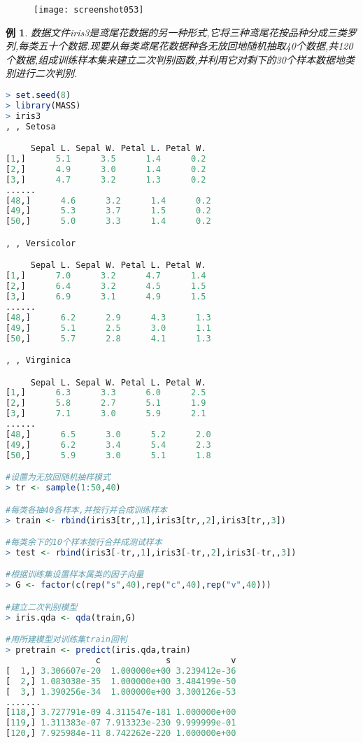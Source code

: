 \documentclass[11pt,a4paper,oneside]{book}
\newtheorem{e}{例}
\begin{document}
\begin{figure}[H]
	\centering
	\texttt{[image: screenshot053]}
\end{figure}
\begin{e}
数据文件iris3是鸢尾花数据的另一种形式,它将三种鸢尾花按品种分成三类罗列,每类五十个数据.现要从每类鸢尾花数据种各无放回地随机抽取40个数据,共120个数据,组成训练样本集来建立二次判别函数,并利用它对剩下的30个样本数据地类别进行二次判别.
\end{e}
\begin{lstlisting}[language=r]
> set.seed(8)
> library(MASS)
> iris3
, , Setosa

     Sepal L. Sepal W. Petal L. Petal W.
[1,]      5.1      3.5      1.4      0.2
[2,]      4.9      3.0      1.4      0.2
[3,]      4.7      3.2      1.3      0.2
......
[48,]      4.6      3.2      1.4      0.2
[49,]      5.3      3.7      1.5      0.2
[50,]      5.0      3.3      1.4      0.2

, , Versicolor

     Sepal L. Sepal W. Petal L. Petal W.
[1,]      7.0      3.2      4.7      1.4
[2,]      6.4      3.2      4.5      1.5
[3,]      6.9      3.1      4.9      1.5
......
[48,]      6.2      2.9      4.3      1.3
[49,]      5.1      2.5      3.0      1.1
[50,]      5.7      2.8      4.1      1.3

, , Virginica

     Sepal L. Sepal W. Petal L. Petal W.
[1,]      6.3      3.3      6.0      2.5
[2,]      5.8      2.7      5.1      1.9
[3,]      7.1      3.0      5.9      2.1
......
[48,]      6.5      3.0      5.2      2.0
[49,]      6.2      3.4      5.4      2.3
[50,]      5.9      3.0      5.1      1.8

#设置为无放回随机抽样模式
> tr <- sample(1:50,40)

#每类各抽40各样本,并按行并合成训练样本
> train <- rbind(iris3[tr,,1],iris3[tr,,2],iris3[tr,,3])

#每类余下的10个样本按行合并成测试样本
> test <- rbind(iris3[-tr,,1],iris3[-tr,,2],iris3[-tr,,3])

#根据训练集设置样本属类的因子向量
> G <- factor(c(rep("s",40),rep("c",40),rep("v",40)))

#建立二次判别模型
> iris.qda <- qda(train,G) 

#用所建模型对训练集train回判
> pretrain <- predict(iris.qda,train)
                  c             s            v
[  1,] 3.306607e-20  1.000000e+00 3.239412e-36
[  2,] 1.083038e-35  1.000000e+00 3.484199e-50
[  3,] 1.390256e-34  1.000000e+00 3.300126e-53
.......
[118,] 3.727791e-09 4.311547e-181 1.000000e+00
[119,] 1.311383e-07 7.913323e-230 9.999999e-01
[120,] 7.925984e-11 8.742262e-220 1.000000e+00


\end{lstlisting}
\end{document}
